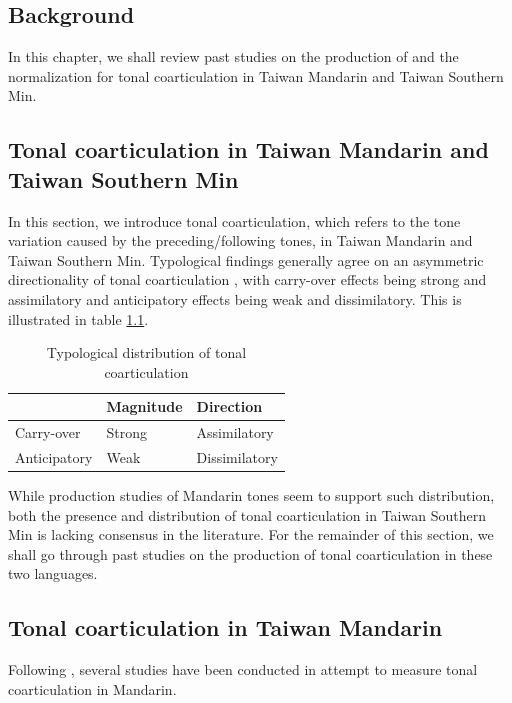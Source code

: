 \documentclass[12pt]{report}
\begin{document}
\begin{CJK}{UTF8}{bsmi}
\pagebreak
\chapter{Background}

In this chapter, we shall review past studies on the production of and the normalization for tonal coarticulation in Taiwan Mandarin and Taiwan Southern Min. 
\section{Tonal coarticulation in Taiwan Mandarin and Taiwan Southern Min}\label{section:Tonal coarticulation in Taiwan Mandarin and Taiwan Southern Min}
In this section, we introduce tonal coarticulation, which refers to the tone variation caused by the preceding/following tones, in Taiwan Mandarin and Taiwan Southern Min. Typological findings generally agree on an asymmetric directionality of tonal coarticulation \citep{ChangHsieh2012}, with carry-over effects being strong and assimilatory and anticipatory effects being weak and dissimilatory. This is illustrated in table \ref{table:Typologicaldistribution}.

\begin{flushleft}
\begin{table}[hbt!]
\begin{tabularx}{\textwidth}{|l|X|X|}
\hline
 & Magnitude & Direction \\
 \hline
 \hline
Carry-over & Strong & Assimilatory\\
\hline
Anticipatory & Weak & Dissimilatory\\
\hline
\end{tabularx}
\caption{Typological distribution of tonal coarticulation}
\label{table:Typologicaldistribution}
\end{table}
\end{flushleft}

While production studies of Mandarin tones seem to support such distribution, both the presence and distribution of tonal coarticulation in Taiwan Southern Min is lacking consensus in the literature. For the remainder of this section, we shall go through past studies on the production of tonal coarticulation in these two languages.

\section{Tonal coarticulation in Taiwan Mandarin}
Following \cite{Chao1968}, several studies have been conducted in attempt to measure tonal coarticulation in Mandarin.


\end{CJK}
\end{document}
